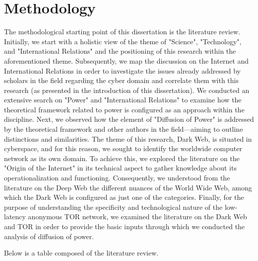 \section{Methodology}
The methodological starting point of this dissertation is the literature review. Initially, we start with a holistic view of the theme of "Science", "Technology", and "International Relations" and the positioning of this research within the aforementioned theme. Subsequently, we map the discussion on the Internet and International Relations in order to investigate the issues already addressed by scholars in the field regarding the cyber domain and correlate them with this research (as presented in the introduction of this dissertation). We conducted an extensive search on "Power" and "International Relations" to examine how the theoretical framework related to power is configured as an approach within the discipline. Next, we observed how the element of "Diffusion of Power" is addressed by the theoretical framework and other authors in the field—aiming to outline distinctions and similarities. The theme of this research, Dark Web, is situated in cyberspace, and for this reason, we sought to identify the worldwide computer network as its own domain. To achieve this, we explored the literature on the "Origin of the Internet" in its technical aspect to gather knowledge about its operationalization and functioning. Consequently, we understood from the literature on the Deep Web the different nuances of the World Wide Web, among which the Dark Web is configured as just one of the categories. Finally, for the purpose of understanding the specificity and technological nature of the low-latency anonymous TOR network, we examined the literature on the Dark Web and TOR in order to provide the basic inputs through which we conducted the analysis of diffusion of power.

Below is a table composed of the literature review.


